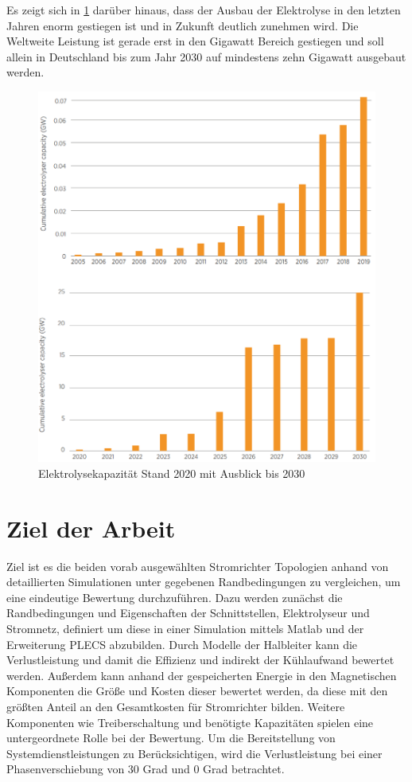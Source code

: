 Es zeigt sich in \ref{fig:elycapacity} darüber hinaus, dass der Ausbau der Elektrolyse in den letzten Jahren enorm gestiegen ist  und in Zukunft deutlich zunehmen wird. Die Weltweite Leistung ist gerade erst in den Gigawatt Bereich gestiegen und soll allein in Deutschland bis zum Jahr 2030 auf mindestens zehn Gigawatt ausgebaut werden.

\begin{figure}
	\centering
	\includegraphics[width=0.7\linewidth]{content/Grafiken/Ely_Capacity}
	\caption[Elektrolyse Kapazität bis 2030]{Elektrolysekapazität Stand 2020 mit Ausblick bis 2030 \cite{IRENA2020}}
	\label{fig:elycapacity}
\end{figure}



\section{Ziel der Arbeit}
Ziel ist es die beiden vorab ausgewählten Stromrichter Topologien anhand von detaillierten Simulationen unter gegebenen Randbedingungen zu vergleichen, um eine eindeutige Bewertung durchzuführen. Dazu werden zunächst die Randbedingungen und Eigenschaften der Schnittstellen, Elektrolyseur und Stromnetz, definiert um diese in einer Simulation mittels Matlab und der Erweiterung PLECS abzubilden. Durch Modelle der Halbleiter kann die Verlustleistung und damit die Effizienz und indirekt der Kühlaufwand bewertet werden. Außerdem kann anhand der gespeicherten Energie in den Magnetischen Komponenten die Größe und Kosten dieser bewertet werden, da diese mit den größten Anteil an den Gesamtkosten für Stromrichter bilden. Weitere Komponenten wie Treiberschaltung und benötigte Kapazitäten spielen eine untergeordnete Rolle bei der Bewertung. Um die Bereitstellung von Systemdienstleistungen zu Berücksichtigen, wird die Verlustleistung bei einer Phasenverschiebung von 30 Grad und 0 Grad betrachtet.